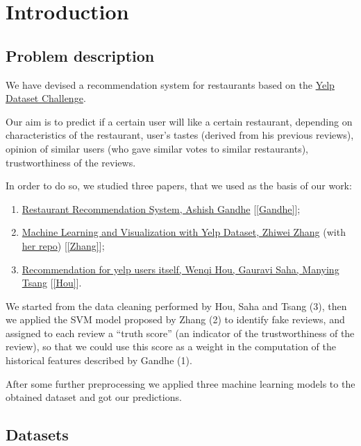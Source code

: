 
\section{Introduction}

\subsection{Problem description} \label{sec:problem}

We have devised a recommendation system for restaurants based on the \href{https://www.yelp.com/dataset/challenge}{Yelp Dataset Challenge}.

Our aim is to predict if a certain user will like a certain restaurant, depending on characteristics of the restaurant, user's tastes (derived from his previous reviews), opinion of similar users (who gave similar votes to similar restaurants), trustworthiness of the reviews.

In order to do so, we studied three papers, that we used as the basis of our work:
\begin{enumerate}
	\item \href{https://www.semanticscholar.org/paper/Restaurant-Recommendation-System-Gandhe/093cecc3e53f2ba4c0c466ad3d8294ba64962050}{Restaurant Recommendation System, Ashish Gandhe} [\ref{Gandhe}];
	\item \href{https://medium.com/@zhiwei_zhang/final-blog-642fb9c7e781}{Machine Learning and Visualization with Yelp Dataset, Zhiwei Zhang} (with \href{https://github.com/zzhang83/Yelp_Sentiment_Analysis}{her repo}) [\ref{Zhang}];
	\item \href{https://www.kaggle.com/wenqihou828/recommendation-for-yelp-users-itself}{Recommendation for yelp users itself, Wenqi Hou, Gauravi Saha, Manying Tsang} [\ref{Hou}].
\end{enumerate}

We started from the data cleaning performed by Hou, Saha and Tsang (3), then we applied the SVM model proposed by Zhang (2) to identify fake reviews, and assigned to each review a ``truth score'' (an indicator of the trustworthiness of the review), so that we could use this score as a weight in the computation of the historical features described by Gandhe (1).

After some further preprocessing we applied three machine learning models to the obtained dataset and got our predictions.

\subsection{Datasets} \label{sec:datasets}

